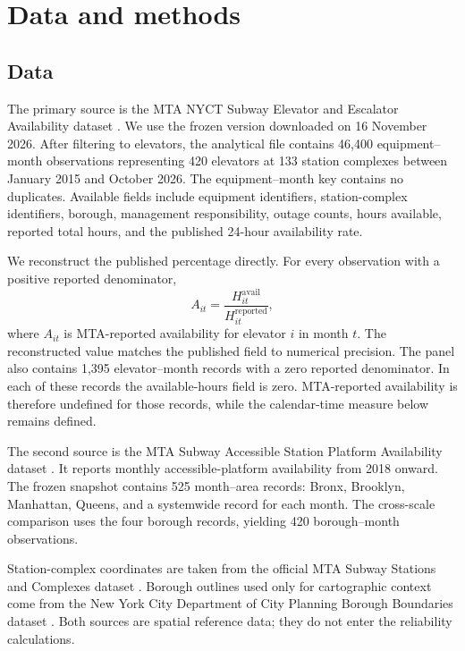 \section{Data and methods}

\subsection{Data}

The primary source is the MTA NYCT Subway Elevator and Escalator Availability dataset \citep{mta_availability2026}. We use the frozen version downloaded on 16 November 2026. After filtering to elevators, the analytical file contains 46,400 equipment--month observations representing 420 elevators at 133 station complexes between January 2015 and October 2026. The equipment--month key contains no duplicates. Available fields include equipment identifiers, station-complex identifiers, borough, management responsibility, outage counts, hours available, reported total hours, and the published 24-hour availability rate.

We reconstruct the published percentage directly. For every observation with a positive reported denominator,
\begin{equation}
A_{it} = \frac{H^{\mathrm{avail}}_{it}}{H^{\mathrm{reported}}_{it}},
\end{equation}
where $A_{it}$ is MTA-reported availability for elevator $i$ in month $t$. The reconstructed value matches the published field to numerical precision. The panel also contains 1,395 elevator--month records with a zero reported denominator. In each of these records the available-hours field is zero. MTA-reported availability is therefore undefined for those records, while the calendar-time measure below remains defined.

The second source is the MTA Subway Accessible Station Platform Availability dataset \citep{mta_platform2026}. It reports monthly accessible-platform availability from 2018 onward. The frozen snapshot contains 525 month--area records: Bronx, Brooklyn, Manhattan, Queens, and a systemwide record for each month. The cross-scale comparison uses the four borough records, yielding 420 borough--month observations.

Station-complex coordinates are taken from the official MTA Subway Stations and Complexes dataset \citep{mta_stations2026}. Borough outlines used only for cartographic context come from the New York City Department of City Planning Borough Boundaries dataset \citep{nycdcp_boroughs2026}. Both sources are spatial reference data; they do not enter the reliability calculations.

